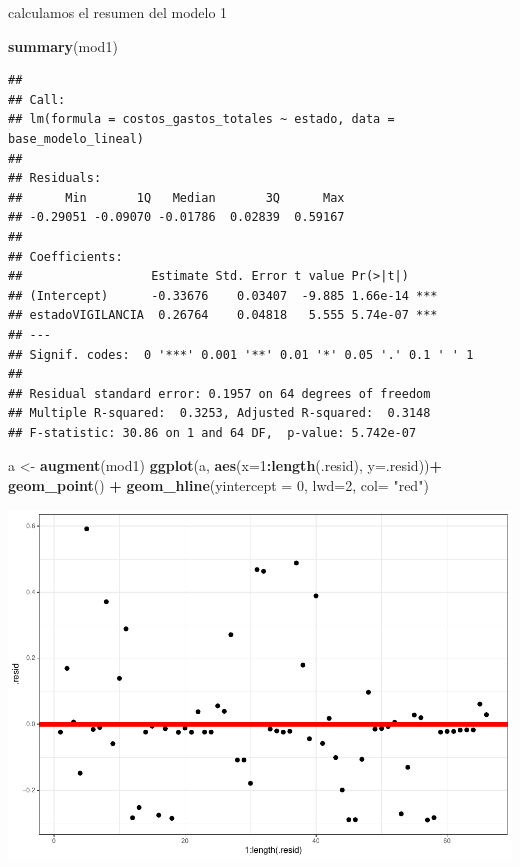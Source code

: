 \documentclass[
  11pt,
  a4paper,
]{book}
\newenvironment{Shaded}{\begin{snugshade}}{\end{snugshade}}
\newcommand{\DataTypeTok}[1]{\textcolor[rgb]{0.13,0.29,0.53}{#1}}
\newcommand{\DecValTok}[1]{\textcolor[rgb]{0.00,0.00,0.81}{#1}}
\newcommand{\KeywordTok}[1]{\textcolor[rgb]{0.13,0.29,0.53}{\textbf{#1}}}
\newcommand{\NormalTok}[1]{#1}
\newcommand{\OperatorTok}[1]{\textcolor[rgb]{0.81,0.36,0.00}{\textbf{#1}}}
\newcommand{\StringTok}[1]{\textcolor[rgb]{0.31,0.60,0.02}{#1}}
\begin{document}
calculamos el resumen del modelo 1

\begin{Shaded}
\begin{Highlighting}[]
\KeywordTok{summary}\NormalTok{(mod1)}
\end{Highlighting}
\end{Shaded}

\begin{verbatim}
## 
## Call:
## lm(formula = costos_gastos_totales ~ estado, data = base_modelo_lineal)
## 
## Residuals:
##      Min       1Q   Median       3Q      Max 
## -0.29051 -0.09070 -0.01786  0.02839  0.59167 
## 
## Coefficients:
##                  Estimate Std. Error t value Pr(>|t|)    
## (Intercept)      -0.33676    0.03407  -9.885 1.66e-14 ***
## estadoVIGILANCIA  0.26764    0.04818   5.555 5.74e-07 ***
## ---
## Signif. codes:  0 '***' 0.001 '**' 0.01 '*' 0.05 '.' 0.1 ' ' 1
## 
## Residual standard error: 0.1957 on 64 degrees of freedom
## Multiple R-squared:  0.3253, Adjusted R-squared:  0.3148 
## F-statistic: 30.86 on 1 and 64 DF,  p-value: 5.742e-07
\end{verbatim}

\begin{Shaded}
\begin{Highlighting}[]
\NormalTok{a <-}\StringTok{ }\KeywordTok{augment}\NormalTok{(mod1)}
\KeywordTok{ggplot}\NormalTok{(a, }\KeywordTok{aes}\NormalTok{(}\DataTypeTok{x=}\DecValTok{1}\OperatorTok{:}\KeywordTok{length}\NormalTok{(.resid), }\DataTypeTok{y=}\NormalTok{.resid))}\OperatorTok{+}
\StringTok{  }\KeywordTok{geom_point}\NormalTok{() }\OperatorTok{+}\StringTok{ }
\StringTok{  }\KeywordTok{geom_hline}\NormalTok{(}\DataTypeTok{yintercept =} \DecValTok{0}\NormalTok{, }\DataTypeTok{lwd=}\DecValTok{2}\NormalTok{, }\DataTypeTok{col=} \StringTok{"red"}\NormalTok{)}
\end{Highlighting}
\end{Shaded}

\includegraphics{index_files/figure-latex/unnamed-chunk-15-1.pdf}
\end{document}
